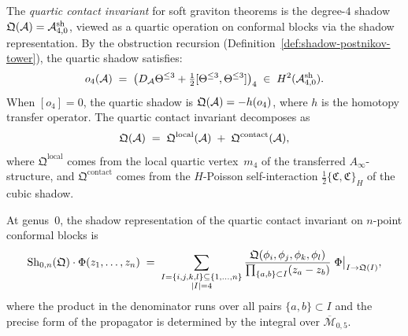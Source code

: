 \begin{definition}
\label{def:thqg-VI-quartic-contact}
The \emph{quartic contact invariant} for soft graviton
theorems is the degree-$4$ shadow
$\mathfrak{Q}(\mathcal{A}) = \mathcal{A}^{\mathrm{sh}}_{4,0}$, viewed as a
quartic operation on conformal blocks via the shadow
representation. By the obstruction recursion
(Definition~\ref{def:shadow-postnikov-tower}), the quartic
shadow satisfies:
\begin{equation}\label{eq:thqg-VI-quartic-obstruction}
o_4(\mathcal{A})
\;=\;
\bigl(D_{\mathcal{A}}\Theta^{\leq 3} + \tfrac{1}{2}
[\Theta^{\leq 3}, \Theta^{\leq 3}]\bigr)_4
\;\in\;
H^2(\mathcal{A}^{\mathrm{sh}}_{4,0}).
\end{equation}
When $[o_4] = 0$, the quartic shadow is
$\mathfrak{Q}(\mathcal{A}) = -h(o_4)$, where $h$ is the homotopy transfer
operator. The quartic contact invariant decomposes as
\begin{equation}\label{eq:thqg-VI-quartic-decomposition}
\mathfrak{Q}(\mathcal{A})
\;=\;
\mathfrak{Q}^{\mathrm{local}}(\mathcal{A})
\;+\;
\mathfrak{Q}^{\mathrm{contact}}(\mathcal{A}),
\end{equation}
where $\mathfrak{Q}^{\mathrm{local}}$ comes from the local
quartic vertex~$m_4$ of the transferred $A_\infty$-structure, and
$\mathfrak{Q}^{\mathrm{contact}}$ comes from the
$H$-Poisson self-interaction
$\tfrac{1}{2}\{\mathfrak{C}, \mathfrak{C}\}_H$ of the cubic shadow.
\end{definition}

\begin{proposition}
\label{prop:thqg-VI-quartic-action}
At genus~$0$, the shadow representation of the quartic contact
invariant on $n$-point conformal blocks is
\begin{equation}\label{eq:thqg-VI-quartic-genus0}
\operatorname{Sh}_{0,n}(\mathfrak{Q}) \cdot \Phi(z_1, \dotsc, z_n)
\;=\;
\sum_{\substack{I = \{i,j,k,l\} \subseteq \{1,\dotsc,n\} \\
 |I| = 4}}
\frac{\mathfrak{Q}(\phi_i, \phi_j, \phi_k, \phi_l)}
 {\prod_{\{a,b\} \subset I} (z_a - z_b)}\;
\Phi\bigl|_{I \to \mathfrak{Q}(I)},
\end{equation}
where the product in the denominator runs over all pairs
$\{a,b\} \subset I$ and the precise form of the propagator is
determined by the integral over $\overline{\mathcal{M}}_{0,5}$.
\end{proposition}

